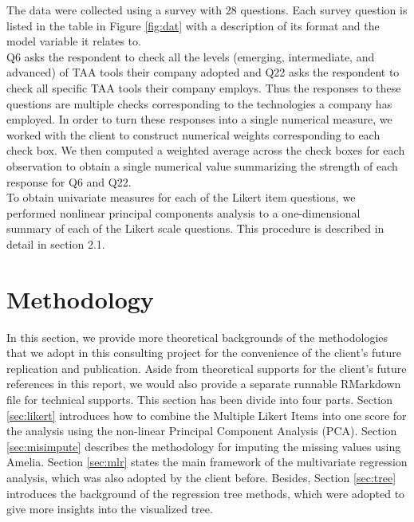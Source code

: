 \documentclass[12pt]{article}
\begin{document}
The data were collected using a survey with 28 questions. Each survey question is listed in the table in Figure \ref{fig:dat} with a description of its format and the model variable it relates to.\\

Q6 asks the respondent to check all the levels (emerging, intermediate, and advanced) of TAA tools their company adopted and Q22 asks the respondent to check all specific TAA tools their company employs. Thus the responses to these questions are multiple checks corresponding to the technologies a company has employed. In order to turn these responses into a single numerical measure, we worked with the client to construct numerical weights corresponding to each check box. We then computed a weighted average across the check boxes for each observation to obtain a single numerical value summarizing the strength of each response for Q6 and Q22. \\

To obtain univariate measures for each of the Likert item questions, we performed nonlinear principal components analysis to a one-dimensional summary of each of the Likert scale questions. This procedure is described in detail in section 2.1.
\section{Methodology}


In this section, we provide more theoretical backgrounds of the methodologies that we adopt in this consulting project for the convenience of the client's future replication and publication. Aside from theoretical supports for the client's future references in this report, we would also provide a separate runnable RMarkdown file for technical supports. This section has been divide into four parts. Section \ref{sec:likert} introduces how to combine the Multiple Likert Items into one score for the analysis using the non-linear Principal Component Analysis (PCA). Section \ref{sec:misimpute} describes the methodology for imputing the missing values using Amelia. Section \ref{sec:mlr} states the main framework of the multivariate regression analysis, which was also adopted by the client before. Besides, Section \ref{sec:tree} introduces the background of the regression tree methods, which were adopted to give more insights into the visualized tree.
\end{document}
